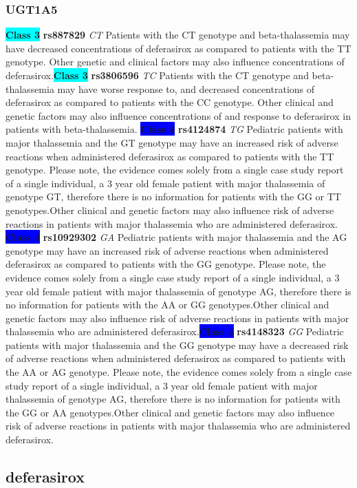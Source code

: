 \documentclass{book}
\begin{document}
\subsubsection{ UGT1A5 }

\begin{center}
\textbf{\colorbox{cyan} {Class 3}} \textbf{ rs887829 } \textit{ CT }
Patients with the CT genotype and beta-thalassemia may have decreased concentrations of deferasirox as compared to patients with the TT genotype. Other genetic and clinical factors may also influence concentrations of deferasirox.\textbf{\colorbox{cyan} {Class 3}} \textbf{ rs3806596 } \textit{ TC }
Patients with the CT genotype and beta-thalassemia may have worse response to, and decreased concentrations of deferasirox as compared to patients with the CC genotype. Other clinical and genetic factors may also influence concentrations of and response to deferasirox in patients with beta-thalassemia.
\textbf{\colorbox{blue} {Class 4}} \textbf{ rs4124874 } \textit{ TG }
Pediatric patients with major thalassemia and the GT genotype may have an increased risk of adverse reactions when administered deferasirox as compared to patients with the TT genotype. Please note, the evidence comes solely from a single case study report of a single individual, a 3 year old female patient with major thalassemia of genotype GT, therefore there is no information for patients with the GG or TT genotypes.Other clinical and genetic factors may also influence risk of adverse reactions in patients with major thalassemia who are administered deferasirox. \textbf{\colorbox{blue} {Class 4}} \textbf{ rs10929302 } \textit{ GA }
Pediatric patients with major thalassemia and the AG genotype may have an increased risk of adverse reactions when administered deferasirox as compared to patients with the GG genotype. Please note, the evidence comes solely from a single case study report of a single individual, a 3 year old female patient with major thalassemia of genotype AG, therefore there is no information for patients with the AA or GG genotypes.Other clinical and genetic factors may also influence risk of adverse reactions in patients with major thalassemia who are administered deferasirox.\textbf{\colorbox{blue} {Class 4}} \textbf{ rs4148323 } \textit{ GG }
Pediatric patients with major thalassemia and the GG genotype may have a decreased risk of adverse reactions when administered deferasirox as compared to patients with the AA or AG genotype. Please note, the evidence comes solely from a single case study report of a single individual, a 3 year old female patient with major thalassemia of genotype AG, therefore there is no information for patients with the GG or AA genotypes.Other clinical and genetic factors may also influence risk of adverse reactions in patients with major thalassemia who are administered deferasirox.

\end{center}\subsection{ deferasirox }
\end{document}
